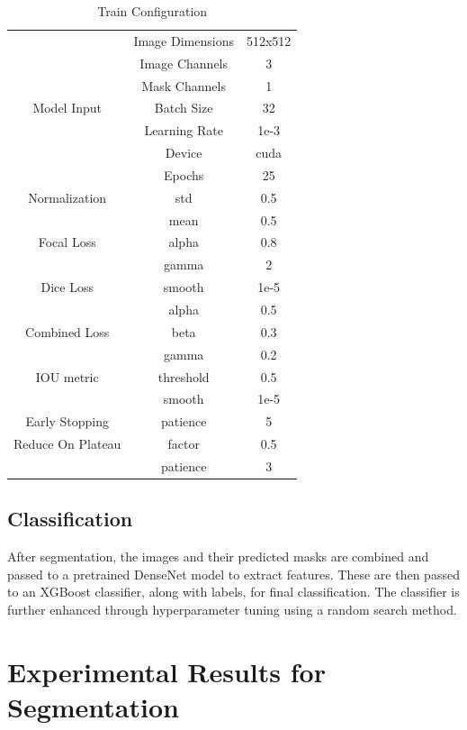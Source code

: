 \documentclass{article}
\begin{document}
\begin{table} [H]
    \centering
    \begin{tabular}{|c|c|c|}
    \hline
         & Image Dimensions & 512x512\\
         & Image Channels & 3\\
         & Mask Channels & 1\\
        Model Input & Batch Size & 32\\
         & Learning Rate & 1e-3\\
         & Device & cuda\\
         & Epochs & 25\\
    \hline
        Normalization & std & 0.5\\
         & mean & 0.5\\
    \hline
        Focal Loss & alpha & 0.8\\
         & gamma & 2\\
    \hline
        Dice Loss & smooth & 1e-5\\
    \hline
         & alpha & 0.5\\
        Combined Loss & beta & 0.3\\
         & gamma & 0.2\\
    \hline
        IOU metric & threshold & 0.5\\
         & smooth & 1e-5\\
    \hline
        Early Stopping & patience & 5\\
    \hline
        Reduce On Plateau & factor & 0.5\\
         & patience & 3\\
    \hline
    \end{tabular}
    \caption{Train Configuration}
    \label{tab:Train Configuration}
\end{table}

\subsection*{Classification}
After segmentation, the images and their predicted masks are combined and passed to a pretrained DenseNet model to extract features. These are then passed to an XGBoost classifier, along with labels, for final classification. The classifier is further enhanced through hyperparameter tuning using a random search method.

\section*{Experimental Results for Segmentation}
\end{document}
